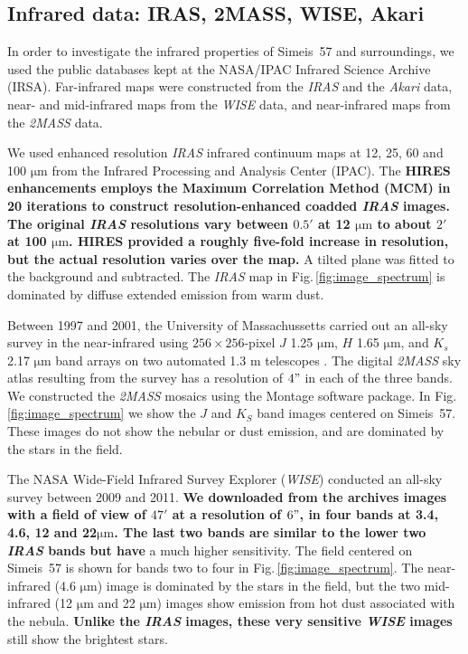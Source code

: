 \documentclass{aa}
\begin{document}
\subsection{Infrared data: IRAS, 2MASS, WISE, Akari}
  
In order to investigate the infrared properties of Simeis~57 and
surroundings, we used the public databases kept at the NASA/IPAC
Infrared Science Archive (IRSA).  Far-infrared maps were constructed
from the {\it IRAS} and the {\it Akari} data, near- and mid-infrared
maps from the {\it WISE} data, and near-infrared maps from the {\it
  2MASS} data.

\par We used enhanced resolution {\it IRAS} \citep{Neugebauer_IRAS}
infrared continuum maps at 12, 25, 60 and 100 $\mathrm{\mu m}$ from
the Infrared Processing and Analysis Center (IPAC). The {\bf HIRES
  enhancements employs the Maximum Correlation Method (MCM)
  \citep{Aumann1990} in 20 iterations to construct
resolution-enhanced coadded {\it IRAS} images. The original {\it IRAS}
resolutions vary between $0.5'$ at 12 $\mathrm{\mu m}$ to about $2'$
at 100 $\mathrm{\mu m}$.  HIRES provided a roughly five-fold increase
in resolution, but the actual resolution varies over the map.}
A tilted plane was fitted to the background and subtracted. The
{\it IRAS} map in Fig.\,\ref{fig:image_spectrum} is dominated by
diffuse extended emission from warm dust.

\par Between 1997 and 2001, the University of Massachussetts carried
out an all-sky survey in the near-infrared using $256\times256$-pixel
$J$ 1.25 $\mathrm{\mu m}$, $H$ 1.65 $\mathrm{\mu m}$, and $K_{s}$
2.17 $\mathrm{\mu m}$ band arrays on two automated 1.3 m telescopes
\citep{skrutskie2006two}. The digital {\it 2MASS} sky atlas resulting
from the survey has a resolution of $4"$ in each of the three bands.
We constructed the {\it 2MASS} mosaics using the Montage software
package. In Fig.\,\ref{fig:image_spectrum} we show the $J$ and $K_{S}$
band images centered on Simeis~57. These images do not show the
nebular or dust emission, and are dominated by the stars in the field.

\par The NASA Wide-Field Infrared Survey Explorer ({\it WISE})
conducted an all-sky survey between 2009 and 2011. {\bf We downloaded
  from the archives images with a field of view of $47'$ at a
  resolution of $6"$, in four bands at 3.4, 4.6, 12 and
  22$\mathrm{\mu m}$. The last two bands are similar to the lower two
  {\it IRAS} bands but have} a much higher sensitivity. The field
centered on Simeis~57 is shown for bands two to four in
Fig.\,\ref{fig:image_spectrum}.  The near-infrared (4.6
$\mathrm{\mu m}$) image is dominated by the stars in the field, but
the two mid-infrared (12 $\mathrm{\mu m}$ and 22 $\mathrm{\mu m}$)
images show emission from hot dust associated with the nebula. {\bf
  Unlike the {\it IRAS} images, these very sensitive {\it WISE}
  images} still show the brightest stars.
\end{document}
